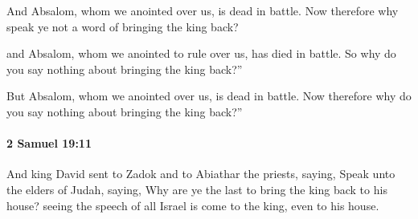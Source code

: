 			\begin{versebox}
					\item[BHS] 
					\item[ASV] And Absalom, whom we anointed over us, is dead in battle. Now therefore why speak ye not a word of bringing the king back?
					\item[NIV] and Absalom, whom we anointed to rule over us, has died in battle. So why do you say nothing about bringing the king back?”
					\item[NRSV] But Absalom, whom we anointed over us, is dead in battle. Now therefore why do you say nothing about bringing the king back?”
			\end{versebox}

		\paragraph{2 Samuel 19:11} %
			\label{2SAMUEL-19-11}

			And king David sent to Zadok and to Abiathar the priests, saying, Speak unto the elders of Judah, saying, Why are ye the last to bring the king back to his house? seeing the speech of all Israel is come to the king, even to his house.

